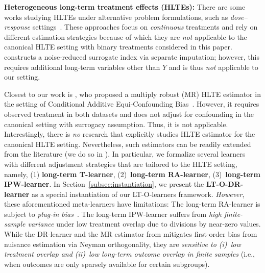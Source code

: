 \documentclass{article}
\theoremstyle{plain}
\theoremstyle{definition}
\theoremstyle{remark}
\newcommand{\1}{\mathds{1}}                %
\newcommand{\methods}{LT-O-learners\xspace}
\newcommand{\DR}{LT-O-DR-learner\xspace}
\begin{document}
\textbf{Heterogeneous long-term treatment effects (HLTEs):} There are some works studying HLTEs under alternative problem formulations, such as \textit{dose–response} settings~\citep{Singh.2022, Yang.2025-dose-response}. These approaches focus on \textit{continuous} treatments and rely on different estimation strategies because of which they are \textit{not} applicable to the canonical HLTE setting with binary treatments considered in this paper. \citet{Huang.2024-Doingmore} constructs a noise-reduced surrogate index via separate imputation; however, this requires additional long-term variables other than $Y$ and is thus \emph{not} applicable to our setting. 

 Closest to our work is \citet{Chen.2025}, who proposed a multiply robust (MR) HLTE estimator in the setting of Conditional Additive Equi-Confounding Bias~\citep{Ghassami.2022}. However, it requires observed treatment in both datasets and does not adjust for confounding in the canonical setting with surrogacy assumption. Thus, it is not applicable. Interestingly, there is \emph{no} research that explicitly studies HLTE estimator for the canonical HLTE setting. Nevertheless, such estimators can be readily extended from the literature (we do so in ). In particular, we formalize several learners with different adjustment strategies that are tailored to the HLTE setting, namely, (1) \textbf{long-term T-learner}, (2)~\textbf{long-term RA-learner}, (3)~\textbf{long-term IPW-learner}. In Section~\ref{subsec:instantiation}, we present the \textbf{\DR} as a special instantiation of our \methods framework. \textit{However}, these aforementioned meta-learners have limitations: The long-term RA-learner is subject to \textit{plug-in bias}~\cite{Kennedy.2022-Sempiparametric}. The long-term IPW-learner suffers from \textit{high finite-sample variance} under low treatment overlap due to divisions by near-zero values. While the DR-learner and the MR estimator from \citet{Chen.2025} mitigates first-order bias from nuisance estimation via Neyman orthogonality, they are \textit{sensitive to (i)~low treatment overlap and (ii)~low long-term outcome overlap in finite samples} (i.e., when outcomes are only sparsely available for certain subgroups). 


\end{document}

